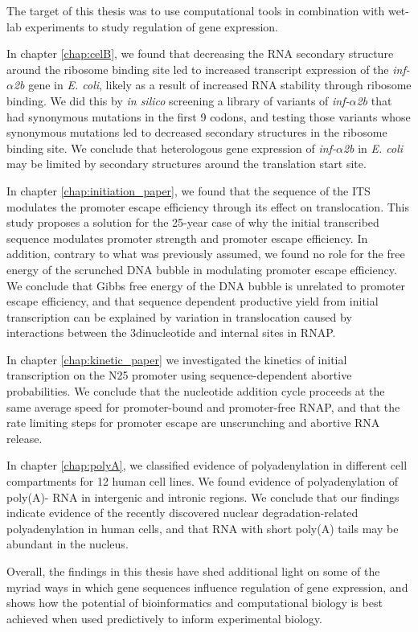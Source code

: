 %
The target of this thesis was to use computational tools in combination with
wet-lab experiments to study regulation of gene expression.

In chapter \ref{chap:celB}, we found that decreasing the RNA secondary
structure around the ribosome binding site led to increased transcript
expression of the \textit{inf-$\alpha$2b} gene in \textit{E. coli}, likely as a
result of increased RNA stability through ribosome binding. We did this by
\textit{in silico} screening a library of variants of \textit{inf-$\alpha$2b}
that had synonymous mutations in the first 9 codons, and testing those variants
whose synonymous mutations led to decreased secondary structures in the
ribosome binding site. We conclude that heterologous gene expression of
\textit{inf-$\alpha$2b} in \textit{E. coli} may be limited by secondary
structures around the translation start site.

In chapter \ref{chap:initiation_paper}, we found that the sequence of the ITS
modulates the promoter escape efficiency through its effect on translocation.
This study proposes a solution for the 25-year case of why the initial
transcribed sequence modulates promoter strength and promoter escape
efficiency. In addition, contrary to what was previously assumed, we found no
role for the free energy of the scrunched DNA bubble in modulating promoter
escape efficiency. We conclude that Gibbs free energy of the DNA bubble is
unrelated to promoter escape efficiency, and that sequence dependent
productive yield from initial transcription can be explained by variation in
translocation caused by interactions between the 3\ppp dinucleotide and
internal sites in RNAP.

In chapter \ref{chap:kinetic_paper} we investigated the kinetics of initial
transcription on the N25 promoter using sequence-dependent abortive
probabilities. We conclude that the nucleotide addition cycle proceeds at the
same average speed for promoter-bound and promoter-free RNAP, and that the rate
limiting steps for promoter escape are unscrunching and abortive RNA release.

In chapter \ref{chap:polyA}, we classified evidence of polyadenylation in
different cell compartments for 12 human cell lines. We found evidence of
polyadenylation of poly(A)- RNA in intergenic and intronic regions. We
conclude that our findings indicate evidence of the recently discovered
nuclear degradation-related polyadenylation in human cells, and that RNA with
short poly(A) tails may be abundant in the nucleus.

Overall, the findings in this thesis have shed additional light on some of the
myriad ways in which gene sequences influence regulation of gene expression,
and shows how the potential of bioinformatics and computational biology is
best achieved when used predictively to inform experimental biology.
